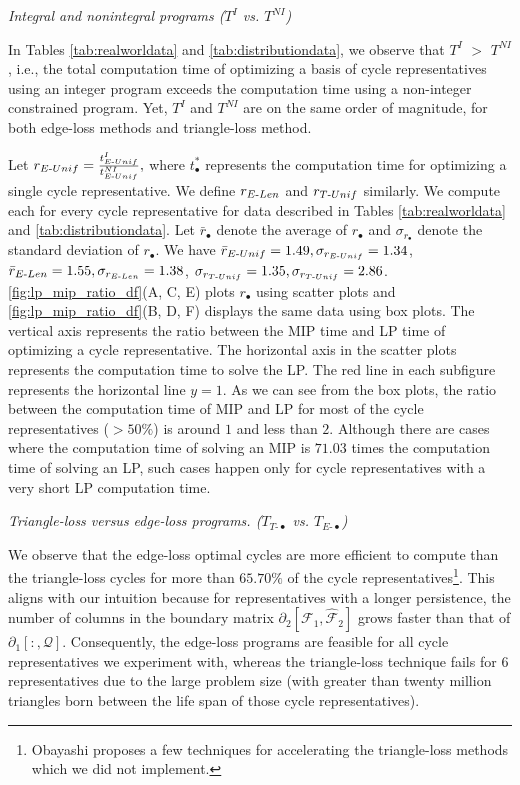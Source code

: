 \noindent \emph{Integral and nonintegral programs ($T^I$ vs. $T^{NI}$)}

In Tables \ref{tab:realworldata} and \ref{tab:distributiondata}, we observe that $T^I$ $>$ $T^{NI}$, i.e., the total computation time of optimizing a basis of cycle representatives using an integer program exceeds the computation time using a non-integer constrained program. Yet, $T^I$ and $T^{NI}$ are on the same order of magnitude, for both edge-loss methods and triangle-loss method.  


Let $r_{E\text{-}Unif} = \frac{t^I_{E\text{-}Unif}}{t^{NI}_{E\text{-}Unif}},$ where $t^*_\bullet$ represents the computation time for optimizing a single cycle representative. We define $r_{E\text{-}Len}$ and $r_{T\text{-}Unif}$ similarly. We compute each for every cycle representative for data described in Tables \ref{tab:realworldata} and \ref{tab:distributiondata}. Let $\bar{r}_\bullet$ denote the average of $r_\bullet$ and $\sigma_{r_\bullet}$ denote the standard deviation of $r_\bullet$. We have $\Bar{r}_{E\text{-}Unif} = 1.49, \sigma_{r_{E\text{-}Unif}} = 1.34$, $\Bar{r}_{E\text{-}Len} = 1.55,  \sigma_{r_{E\text{-}Len}} = 1.38$, $ \sigma_{r_{T\text{-}Unif}} = 1.35, \sigma_{r_{T\text{-}Unif}} = 2.86$. \fig \ref{fig:lp_mip_ratio_df}(A, C, E) plots $r_\bullet$ using scatter plots and \fig \ref{fig:lp_mip_ratio_df}(B, D, F) displays the same data using box plots. The vertical axis represents the ratio between the MIP time and LP time of optimizing a cycle representative. The horizontal axis in the scatter plots represents the computation time to solve the LP. The red line in each subfigure represents the horizontal line $y=1$. As we can see from the box plots, the ratio between the computation time of MIP and LP for most of the cycle representatives ($>50\%$) is around $1$ and less than $2$. Although there are cases where the computation time of solving an MIP is $71.03$ times the computation time of solving an LP, such cases happen only for cycle representatives with a very short LP computation time.  


\noindent \emph{Triangle-loss versus edge-loss programs. ($T_{T\text{-}\bullet}$ vs. $T_{E\text{-}\bullet}$)} 
 

We observe that the edge-loss optimal cycles are more efficient to compute than the triangle-loss cycles for more than $65.70\%$ of the cycle representatives\footnote{Obayashi \cite{Obayashi2018} proposes a few techniques for accelerating the triangle-loss methods which we did not implement.}. This aligns with our intuition because for representatives with a longer persistence, the number of columns in the boundary matrix $\partial_{2}[ \mathcal{F}_1 , \hat {\mathcal{F}}_{2} ]$ grows faster than that of $\partial_1[:, \mathcal{Q}]$. Consequently, the edge-loss programs are feasible for all cycle representatives we experiment with, whereas the triangle-loss technique fails for $6$ representatives due to the large problem size (with greater than twenty million triangles born between the life span of those cycle representatives).

